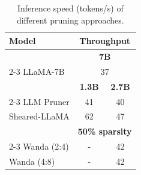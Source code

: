\begin{table}[h]
\centering
\caption{Inference speed (tokens/s) of different pruning approaches.}
\begin{tabular}{@{}l|cc@{}}
\toprule
  \textbf{Model}                     & \multicolumn{2}{c}{\textbf{Throughput}}    \\ \midrule
                       & \multicolumn{2}{c}{\textbf{7B}}            \\
                       \cmidrule(lr){2-3}
{LLaMA-7B}      & \multicolumn{2}{c}{37}                     \\
\midrule
                       & \textbf{1.3B}        & \textbf{2.7B}       \\
                       \cmidrule(lr){2-3}
{LLM Pruner}    & 41                   & 40                  \\
{Sheared-LLaMA} & 62                   & 47                  \\
\midrule
                       & \multicolumn{2}{c}{\textbf{50\% sparsity}} \\
                       \cmidrule(lr){2-3}
{Wanda (2:4)}   & -                    & 42                  \\
{Wanda (4:8)}   & -                    & 42                  \\ \bottomrule
\end{tabular}
\label{tab:inference}
\end{table}
